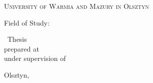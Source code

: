 \begin{center}
    \vspace*{0.5cm}

    {\Large\textsc{University of Warmia and Mazury in Olsztyn}\par}
    \vspace{0.3cm}
    {\Large\textsc{\thesisFacultyEN}\par}

    \vfill

    {\Large\bfseries \thesisauthor\par}
    \vspace{0.3cm}
    {\large Field of Study: \thesisFieldEN\par}

    \vfill

    {\LARGE\bfseries \thesistitleEN\par}

    \vfill\vfill

    \begin{minipage}{0.85\textwidth}
        \centering
        \large
        \thesisDegreeEN\ Thesis\\[0.3cm]
        prepared at \thesisChairEN\\[0.3cm]
        under supervision of\\
        \thesisAdvisorEN
    \end{minipage}

    \vfill

    {\large Olsztyn, \graduationyear\par}
    \vspace*{0.5cm}
\end{center}

\cleardoublepage
\pagestyle{uwmfoot}
